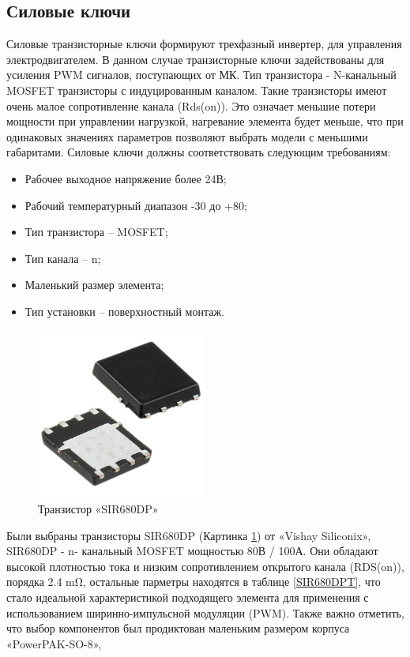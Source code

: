     \subsection{Силовые ключи}
    Силовые транзисторные ключи формируют трехфазный инвертер, для управления электродвигателем.  В данном случае транзисторные ключи задействованы для усиления PWM сигналов, поступающих от МК. Тип транзистора - N-канальный MOSFET транзисторы с индуцированным каналом. Такие транзисторы имеют очень малое сопротивление канала (Rds(on)). Это означает меньшие потери мощности при управлении нагрузкой, нагревание элемента будет меньше, что при одинаковых значениях параметров позволяют выбрать модели с меньшими габаритами. Силовые ключи должны соответствовать следующим требованиям:
    \begin{itemize}
        \item Рабочее выходное напряжение более 24В;
        \item Рабочий температурный диапазон -30 до +80;
        \item Тип транзистора – MOSFET;
        \item Тип канала – n;
        \item Маленький размер элемента;
        \item Тип установки – поверхностный монтаж.
    \end{itemize}
    \begin{figure}[H]
        \centering
        \includegraphics[width=0.5\textwidth]{Src/images/Transistir.png}
        \caption{Транзистор «SIR680DP»}
        \label{SIR680DP}
    \end{figure}

    Были выбраны транзисторы SIR680DP (Картинка \ref{SIR680DP}) от «Vishay Siliconix», SIR680DP - n- канальный MOSFET мощностью 80В / 100А. Они обладают высокой плотностью тока и низким сопротивлением открытого канала (RDS(on)), порядка 2.4 mΩ, остальные парметры находятся в таблице \ref{SIR680DPT}, что стало идеальной характеристикой подходящего элемента для применения с использованием ширинно-импульсной модуляции (PWM). Также важно отметить, что выбор компонентов был продиктован маленьким размером корпуса «PowerPAK-SO-8», 

